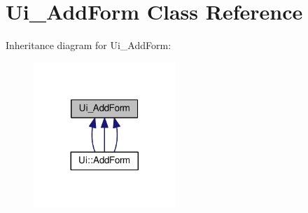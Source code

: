 \hypertarget{class_ui___add_form}{}\section{Ui\+\_\+\+Add\+Form Class Reference}
\label{class_ui___add_form}


Inheritance diagram for Ui\+\_\+\+Add\+Form\+:
\nopagebreak
\begin{figure}[H]
\begin{center}
\leavevmode
\includegraphics[width=152pt]{class_ui___add_form__inherit__graph}
\end{center}
\end{figure}
